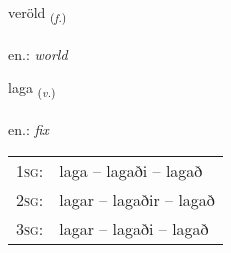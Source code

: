 \documentclass[frontgrid, backgrid]{flacards}\usepackage[]{graphicx}\usepackage[]{xcolor}
\begin{document}
\renewcommand{\blhead}{\vskip5pt {\small\bfseries\footnotesize Nafnorð | Noun }}
\renewcommand{\bcfoot}{\vskip5pt \hspace{2pt}{\small\bfseries\footnotesize 2K}}


{veröld \small{\textsubscript{(\textit{f.})}} \\[1ex] %
\textphonetic{[vɛːrœlt]} \\
en.: \emph{world} \\  [2ex]
\renewcommand*{\arraystretch}{0.8}
}

\renewcommand{\flhead}{\vskip5pt \fboxsep=0pt {\small\bfseries\footnotesize Sagnorð | Verb}}
\renewcommand{\fcfoot}{\vskip5pt \fboxsep=0pt \hspace{2pt}{\small\bfseries\footnotesize 2K}}

\renewcommand{\blhead}{\vskip5pt {\small\bfseries\footnotesize Sagnorð | Verb }}
\renewcommand{\bcfoot}{\vskip5pt \hspace{2pt}{\small\bfseries\footnotesize 2K}}


{laga \small{\textsubscript{(\textit{v.})}} \\[1ex] %
\textphonetic{[laːɣa]} \\
en.: \emph{fix} \\  [2ex]
\renewcommand*{\arraystretch}{0.8}
\begin{tabular}{p{1cm}l}
\textsc{1sg}: & laga -- lagaði -- lagað \\ 
\textsc{2sg}: & lagar -- lagaðir -- lagað \\ 
\textsc{3sg}: & lagar -- lagaði -- lagað \\ 
\end{tabular}
}

\renewcommand{\flhead}{\vskip5pt \fboxsep=0pt {\small\bfseries\footnotesize Sagnorð | Verb}}
\renewcommand{\fcfoot}{\vskip5pt \fboxsep=0pt \hspace{2pt}{\small\bfseries\footnotesize 2K}}
\end{document}
